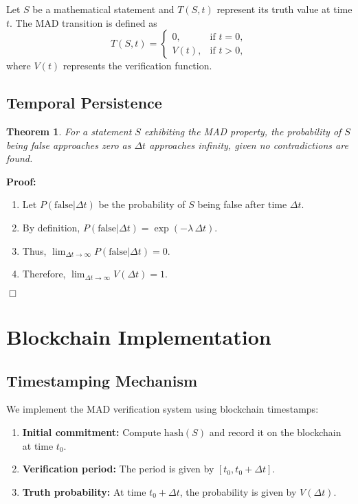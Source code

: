 \documentclass[11pt]{article}
\newtheorem{theorem}{Theorem}[section]
\begin{document}
Let $S$ be a mathematical statement and $T(S,t)$ represent its truth value at time $t$. The MAD transition is defined as
\[
T(S,t) = \begin{cases}
0, & \text{if } t = 0, \\
V(t), & \text{if } t > 0,
\end{cases}
\]
where $V(t)$ represents the verification function.

\subsection{Temporal Persistence}

\begin{theorem}
For a statement $S$ exhibiting the MAD property, the probability of $S$ being false approaches zero as $\Delta t$ approaches infinity, given no contradictions are found.
\end{theorem}

\noindent\textbf{Proof:} 
\begin{enumerate}[label=(\roman*)]
    \item Let $P(\text{false}|\Delta t)$ be the probability of $S$ being false after time $\Delta t$.
    \item By definition, $P(\text{false}|\Delta t)=\exp(-\lambda\,\Delta t)$.
    \item Thus, $\displaystyle \lim_{\Delta t \to \infty}P(\text{false}|\Delta t) = 0$.
    \item Therefore, $\displaystyle \lim_{\Delta t \to \infty} V(\Delta t) = 1$.
\end{enumerate}
\hfill $\Box$

\section{Blockchain Implementation}

\subsection{Timestamping Mechanism}

We implement the MAD verification system using blockchain timestamps:
\begin{enumerate}[label=(\arabic*)]
    \item \textbf{Initial commitment:} Compute $\mathrm{hash}(S)$ and record it on the blockchain at time $t_0$.
    \item \textbf{Verification period:} The period is given by $[t_0, t_0+\Delta t]$.
    \item \textbf{Truth probability:} At time $t_0+\Delta t$, the probability is given by $V(\Delta t)$.
\end{enumerate}
\end{document}
